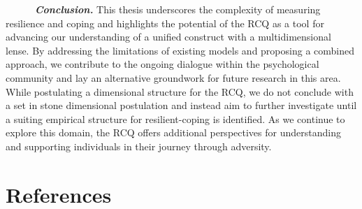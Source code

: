 \documentclass[
  man,floatsintext]{apa7}
\begin{document}
~~~~~~\textbf{\emph{Conclusion.}} This thesis underscores the complexity of measuring resilience and coping and highlights the potential of the RCQ as a tool for advancing our understanding of a unified construct with a multidimensional lense. By addressing the limitations of existing models and proposing a combined approach, we contribute to the ongoing dialogue within the psychological community and lay an alternative groundwork for future research in this area. While postulating a dimensional structure for the RCQ, we do not conclude with a set in stone dimensional postulation and instead aim to further investigate until a suiting empirical structure for resilient-coping is identified. As we continue to explore this domain, the RCQ offers additional perspectives for understanding and supporting individuals in their journey through adversity.

\newpage

\section{References}\label{references}

\footnotesize
\end{document}
